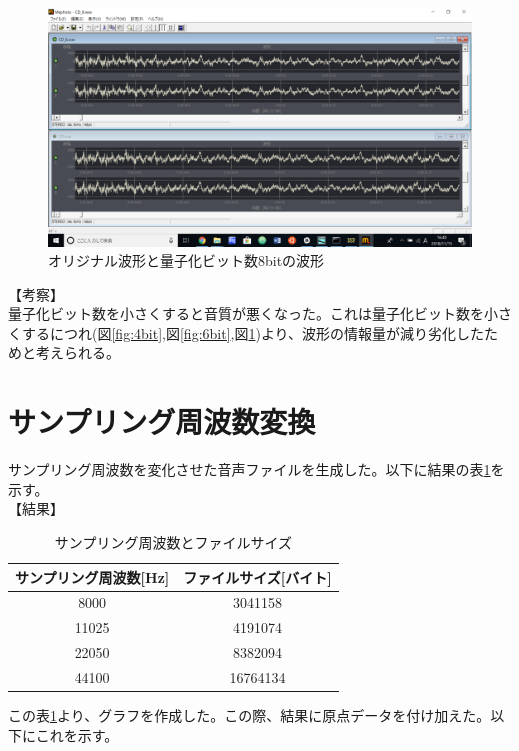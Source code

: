 \documentclass[uplatex, titlepage]{jsarticle}
\begin{document}
\begin{figure}[H]
  \centering
  \includegraphics[scale=0.4]{./tuusin1.4/diff8.png}
  \caption{オリジナル波形と量子化ビット数8bitの波形}
  \label{fig:8bit}
\end{figure}

【考察】\\
  量子化ビット数を小さくすると音質が悪くなった。これは量子化ビット数を小さくするにつれ(図\ref{fig:4bit},図\ref{fig:6bit},図\ref{fig:8bit})より、波形の情報量が減り劣化したためと考えられる。


\section{サンプリング周波数変換}

  サンプリング周波数を変化させた音声ファイルを生成した。以下に結果の表\ref{table:filesamp}を示す。\\

【結果】
\begin{table}[H]
  \centering
  \caption{サンプリング周波数とファイルサイズ}
  \label{table:filesamp}
  \begin{tabular}{|c|c|} \hline
    サンプリング周波数[Hz] & ファイルサイズ[バイト] \\ \hline
    8000 & 3041158 \\ \hline
    11025 & 4191074 \\ \hline
    22050 & 8382094 \\ \hline
    44100 & 16764134 \\ \hline
  \end{tabular}
\end{table}

  この表\ref{table:filesamp}より、グラフを作成した。この際、結果に原点データを付け加えた。以下にこれを示す。
\end{document}
